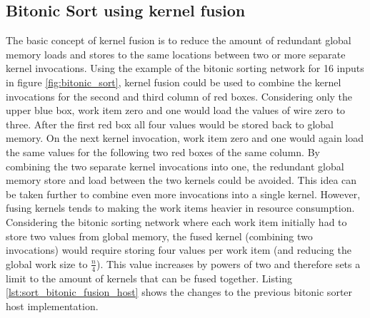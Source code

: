 \subsection{Bitonic Sort using kernel fusion}

The basic concept of kernel fusion is to reduce the amount of redundant global memory loads and stores to the same locations between two or more separate kernel invocations.
Using the example of the bitonic sorting network for 16 inputs in figure \ref{fig:bitonic_sort}, kernel fusion could be used to combine the kernel invocations for the second and third column of red boxes. Considering only the upper blue box, work item zero and one would load the values of wire zero to three. After the first red box all four values would be stored back to global memory. On the next kernel invocation, work item zero and one would again load the same values for the following two red boxes of the same column. By combining the two separate kernel invocations into one, the redundant global memory store and load between the two kernels could be avoided.
This idea can be taken further to combine even more invocations into a single kernel. However, fusing kernels tends to making the work items heavier in resource consumption. Considering the bitonic sorting network where each work item initially had to store two values from global memory, the fused kernel (combining two invocations) would require storing four values per work item (and reducing the global work size to $\frac{n}{4}$). This value increases by powers of two and therefore sets a limit to the amount of kernels that can be fused together.
Listing \ref{lst:sort_bitonic_fusion_host} shows the changes to the previous bitonic sorter host implementation.



